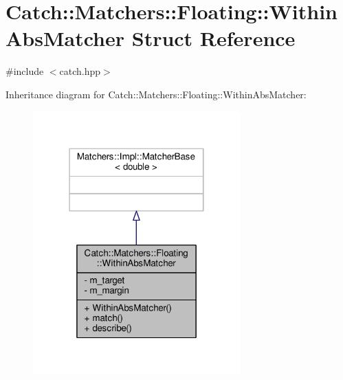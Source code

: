\hypertarget{struct_catch_1_1_matchers_1_1_floating_1_1_within_abs_matcher}{\section{Catch\-:\-:Matchers\-:\-:Floating\-:\-:Within\-Abs\-Matcher Struct Reference}
\label{struct_catch_1_1_matchers_1_1_floating_1_1_within_abs_matcher}
}


{\ttfamily \#include $<$catch.\-hpp$>$}



Inheritance diagram for Catch\-:\-:Matchers\-:\-:Floating\-:\-:Within\-Abs\-Matcher\-:
\nopagebreak
\begin{figure}[H]
\begin{center}
\leavevmode
\includegraphics[width=226pt]{struct_catch_1_1_matchers_1_1_floating_1_1_within_abs_matcher__inherit__graph}
\end{center}
\end{figure}


